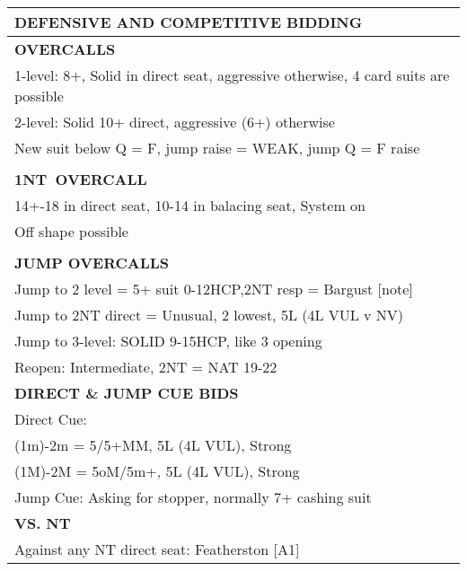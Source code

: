 \documentclass{article}
\newcommand\N{{\footnotesize NT}}
\begin{document}
\noindent
\small{
\begin{minipage}{90mm}
	\begin{tabular}{| p{88mm} |}
		\hline
		\cellcolor{green!25} \textbf{DEFENSIVE AND COMPETITIVE BIDDING} \\ \hline
		\cellcolor{orange!25}\textbf{OVERCALLS} \\ \hline
		1-level: 8+, Solid in direct seat, aggressive otherwise,
		4 card suits are possible\\ \hline
		2-level: Solid 10+ direct, aggressive (6+) otherwise\\ \hline
		New suit below Q = F, jump raise = WEAK, jump Q = F raise\\ \hline
		\\ \hline
		\cellcolor{orange!25}\textbf{1\N \ OVERCALL} \\ \hline
		14+-18 in direct seat, 10-14 in balacing seat,
		System on\\ \hline
		Off shape possible\\ \hline
		\\ \hline
		\cellcolor{orange!25}\textbf{JUMP OVERCALLS} \\ \hline
		Jump to 2 level = 5+ suit 0-12HCP,2{\N} resp = Bargust [note]\\ \hline
		Jump to 2{\N} direct = Unusual, 2 lowest, 5L (4L VUL v NV)\\ \hline
		Jump to 3-level: SOLID 9-15HCP, like 3 opening\\ \hline
		Reopen: Intermediate, 2{\N} = NAT 19-22\\ \hline
		\cellcolor{orange!25}\textbf{DIRECT \& JUMP CUE BIDS} \\ \hline
		Direct Cue:\\ \hline
		(1m)-2m = 5/5+MM, 5L (4L VUL), Strong\\ \hline
		(1M)-2M = 5oM/5m+, 5L (4L VUL), Strong\\ \hline
		Jump Cue: Asking for stopper, normally 7+ cashing suit\\ \hline
		\cellcolor{orange!25}\textbf{VS. NT} \\ \hline
		Against any NT direct seat: Featherston [A1]\\ \hline

\end{tabular}
\end{minipage}}
\end{document}
